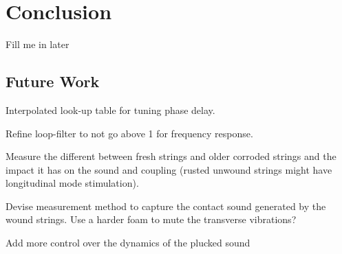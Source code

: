 \documentclass[../main.tex]{subfiles}
\begin{document}
\chapter{Conclusion}
Fill me in later

\section{Future Work}
Interpolated look-up table for tuning phase delay.

Refine loop-filter to not go above 1 for frequency response.

Measure the different between fresh strings and older corroded strings and the impact it has on the sound and coupling (rusted unwound strings might have longitudinal mode stimulation).

Devise measurement method to capture the contact sound generated by the wound strings. Use a harder foam to mute the transverse vibrations?

Add more control over the dynamics of the plucked sound
\end{document}
